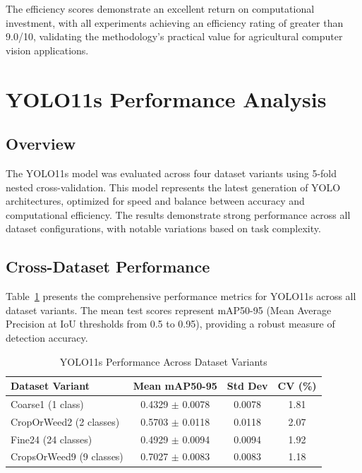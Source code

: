 The efficiency scores demonstrate an excellent return on computational investment, with all experiments achieving an efficiency rating of greater than 9.0/10, validating the methodology's practical value for agricultural computer vision applications.

\section{YOLO11s Performance Analysis}

\subsection{Overview}

The YOLO11s model was evaluated across four dataset variants using 5-fold nested cross-validation. This model represents the latest generation of YOLO architectures, optimized for speed and balance between accuracy and computational efficiency. The results demonstrate strong performance across all dataset configurations, with notable variations based on task complexity.

\subsection{Cross-Dataset Performance}

Table~\ref{tab:yolo11s_results} presents the comprehensive performance metrics for YOLO11s across all dataset variants. The mean test scores represent mAP50-95 (Mean Average Precision at IoU thresholds from 0.5 to 0.95), providing a robust measure of detection accuracy.

\begin{table}[htbp]
\centering
\caption{YOLO11s Performance Across Dataset Variants}
\label{tab:yolo11s_results}
\begin{tabular}{lccc}
\toprule
\textbf{Dataset Variant} & \textbf{Mean mAP50-95} & \textbf{Std Dev} & \textbf{CV (\%)} \\
\midrule
Coarse1 (1 class)        & 0.4329 $\pm$ 0.0078 & 0.0078 & 1.81 \\
CropOrWeed2 (2 classes)  & 0.5703 $\pm$ 0.0118 & 0.0118 & 2.07 \\
Fine24 (24 classes)      & 0.4929 $\pm$ 0.0094 & 0.0094 & 1.92 \\
CropsOrWeed9 (9 classes) & 0.7027 $\pm$ 0.0083 & 0.0083 & 1.18 \\
\bottomrule
\end{tabular}
\end{table}

